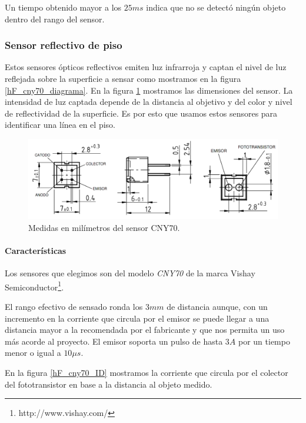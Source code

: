 Un tiempo obtenido mayor a los $25ms$ indica que no se detect\'o ning\'un objeto dentro del rango del sensor.

\subsubsection{Sensor reflectivo de piso}
\label{h_sensado_piso}

Estos sensores \'opticos reflectivos emiten luz infrarroja y captan el nivel de luz reflejada sobre la superficie a sensar
como mostramos en la figura \ref{hF_cny70_diagrama}.
En la figura \ref{hF_cny70_dim} mostramos las dimensiones del sensor.
La intensidad de luz captada depende de la distancia al objetivo y del color y nivel de reflectividad de la superficie.
Es por esto que usamos estos sensores para identificar una l\'inea en el piso.

\begin{figure}[h]
	\centering
	\includegraphics[scale=0.25]{figuras/cny70_dim.png}
	\caption{Medidas en mil\'imetros del sensor CNY70.}
	\label{hF_cny70_dim}
\end{figure}

\paragraph{Caracter\'isticas}
\label{h_sensado_piso_caracteristicas}

Los sensores que elegimos son del modelo \emph{CNY70} de la marca Vishay Semiconductor\footnote{http://www.vishay.com/}.

El rango efectivo de sensado ronda los $3 mm$ de distancia aunque, con un incremento en la corriente que circula por el emisor
se puede llegar a una distancia mayor a la recomendada por el fabricante y que nos permita un uso m\'as acorde al proyecto.
El emisor soporta un pulso de hasta $3 A$ por un tiempo menor o igual a $10\mu s$.

En la figura \ref{hF_cny70_ID} mostramos la corriente que circula por el colector del fototransistor en base a la distancia al objeto medido.

